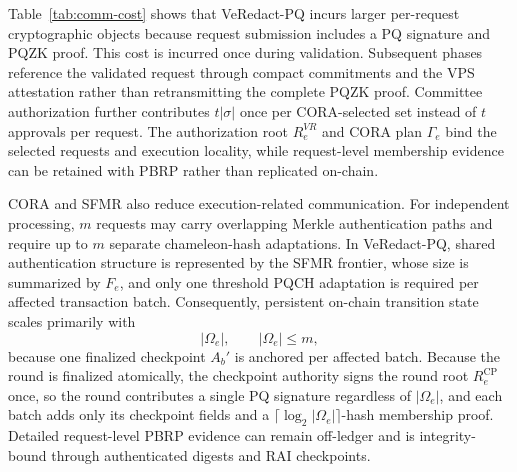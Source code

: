 \documentclass[lettersize,journal]{IEEEtran}
\begin{document}
Table~\ref{tab:comm-cost} shows that VeRedact-PQ incurs larger
per-request cryptographic objects because request submission includes a
PQ signature and PQZK proof. This cost is incurred once during
validation. Subsequent phases reference the validated request through
compact commitments and the VPS attestation rather than retransmitting
the complete PQZK proof. Committee authorization further contributes
$t|\sigma|$ once per CORA-selected set instead of $t$ approvals per
request. The authorization root $R_e^{VR}$ and CORA plan $\Gamma_e$
bind the selected requests and execution locality, while request-level
membership evidence can be retained with PBRP rather than replicated
on-chain.

CORA and SFMR also reduce execution-related communication. For
independent processing, $m$ requests may carry overlapping Merkle
authentication paths and require up to $m$ separate chameleon-hash
adaptations. In VeRedact-PQ, shared authentication structure is
represented by the SFMR frontier, whose size is summarized by $F_e$,
and only one threshold PQCH adaptation is required per affected
transaction batch. Consequently, persistent on-chain transition state
scales primarily with
\begin{equation}
|\Omega_e|,
\qquad |\Omega_e|\leq m,
\end{equation}
because one finalized checkpoint $A_b'$ is anchored per affected batch.
\textcolor{e5}{Because the round is finalized atomically, the
checkpoint authority signs the round root $R_e^{\mathrm{CP}}$ once, so
the round contributes a single PQ signature regardless of
$|\Omega_e|$, and each batch adds only its checkpoint fields and a
$\lceil\log_2|\Omega_e|\rceil$-hash membership proof.}
Detailed request-level PBRP evidence can remain off-ledger and is
integrity-bound through authenticated digests and RAI checkpoints.
\end{document}
